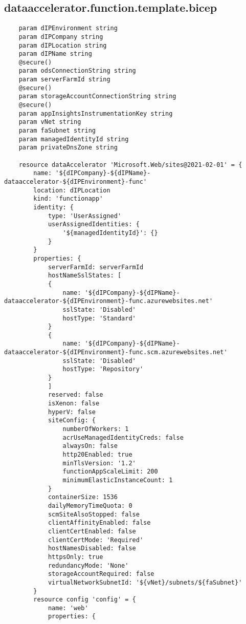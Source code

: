 \documentclass[dutch,dit,thesis]{hogentreport}
\begin{document}
\subsection{dataaccelerator.function.template.bicep}
\label{sec:dataaccelerator.function.template.bicep}
\begin{lstlisting}
    param dIPEnvironment string
    param dIPCompany string
    param dIPLocation string
    param dIPName string
    @secure()
    param odsConnectionString string
    param serverFarmId string
    @secure()
    param storageAccountConnectionString string
    @secure()
    param appInsightsInstrumentationKey string
    param vNet string
    param faSubnet string
    param managedIdentityId string
    param privateDnsZone string

    resource dataAccelerator 'Microsoft.Web/sites@2021-02-01' = {
        name: '${dIPCompany}-${dIPName}-dataaccelerator-${dIPEnvironment}-func'
        location: dIPLocation
        kind: 'functionapp'
        identity: {
            type: 'UserAssigned'
            userAssignedIdentities: {
                '${managedIdentityId}': {}
            }
        }
        properties: {
            serverFarmId: serverFarmId
            hostNameSslStates: [
            {
                name: '${dIPCompany}-${dIPName}-dataaccelerator-${dIPEnvironment}-func.azurewebsites.net'
                sslState: 'Disabled'
                hostType: 'Standard'
            }
            {
                name: '${dIPCompany}-${dIPName}-dataaccelerator-${dIPEnvironment}-func.scm.azurewebsites.net'
                sslState: 'Disabled'
                hostType: 'Repository'
            }
            ]
            reserved: false
            isXenon: false
            hyperV: false
            siteConfig: {
                numberOfWorkers: 1
                acrUseManagedIdentityCreds: false
                alwaysOn: false
                http20Enabled: true
                minTlsVersion: '1.2'
                functionAppScaleLimit: 200
                minimumElasticInstanceCount: 1
            }
            containerSize: 1536
            dailyMemoryTimeQuota: 0
            scmSiteAlsoStopped: false
            clientAffinityEnabled: false
            clientCertEnabled: false
            clientCertMode: 'Required'
            hostNamesDisabled: false
            httpsOnly: true
            redundancyMode: 'None'
            storageAccountRequired: false
            virtualNetworkSubnetId: '${vNet}/subnets/${faSubnet}'
        }
        resource config 'config' = {
            name: 'web'
            properties: {

\end{lstlisting}
\end{document}
